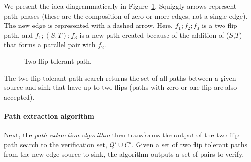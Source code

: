 \documentclass[sigplan,review,nonacm=true]{acmart}
\begin{document}
We present the idea diagrammatically in Figure~\ref{figure_two_flip}.
Squiggly arrows represent path phases (these are the composition of zero or more edges, not a single edge).
The new edge is represented with a dashed arrow.
Here, $f_1 ; f_2 ; f_3$ is a two flip path, and $f_1 ; (S, T) ; f_3$ is a new path created because of the addition of ($S$,$T$) that forms a parallel pair with $f_2$.

\begin{figure}
\begin{center}
\end{center}
\caption{Two flip tolerant path.}
\label{figure_two_flip}
\end{figure}

The two flip tolerant path search returns the set of all paths between a given source and sink that have up to two flips (paths with zero or one flip are also accepted).

\paragraph{Path extraction algorithm}
Next, the \textit{path extraction algorithm} then transforms the output of the two flip path search to the verification set, $Q' \cup C'$.
Given a set of two flip tolerant paths from the new edge source to sink, the algorithm outputs a set of pairs to verify.
\end{document}
